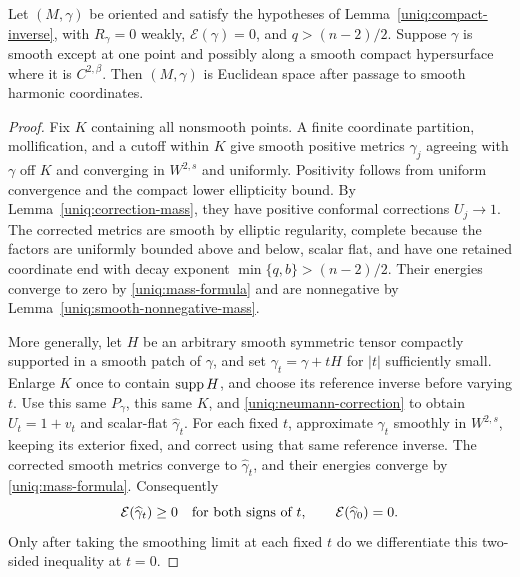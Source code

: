 \begin{lemma}
\label{uniq:rough-zero-mass}
Let $(M,\gamma)$ be oriented and satisfy the hypotheses of
Lemma~\ref{uniq:compact-inverse}, with $R_\gamma=0$ weakly,
$\mathcal E(\gamma)=0$, and $q>(n-2)/2$. Suppose $\gamma$ is
smooth except at one point and possibly along a smooth compact
hypersurface where it is $C^{2,\beta}$. Then $(M,\gamma)$ is
Euclidean space after passage to smooth harmonic coordinates.
\end{lemma}

\begin{proof}
Fix $K$ containing all nonsmooth points. A finite coordinate
partition, mollification, and a cutoff within $K$ give smooth
positive metrics $\gamma_j$ agreeing with $\gamma$ off $K$
and converging in $W^{2,s}$ and uniformly. Positivity follows
from uniform convergence and the compact lower ellipticity bound.
By Lemma~\ref{uniq:correction-mass}, they have positive conformal
corrections $U_j\to1$. The corrected metrics are smooth by elliptic
regularity, complete because the factors are uniformly bounded
above and below, scalar flat, and have one retained coordinate
end with decay exponent $\min\{q,b\}>(n-2)/2$. Their energies converge to
zero by \eqref{uniq:mass-formula} and are nonnegative by
Lemma~\ref{uniq:smooth-nonnegative-mass}.

More generally, let $H$ be an arbitrary smooth symmetric tensor
compactly supported in a smooth patch of $\gamma$, and set
$\gamma_t=\gamma+tH$ for $|t|$ sufficiently small. Enlarge $K$
once to contain $\operatorname{supp} H$, and choose its reference inverse before
varying $t$. Use this same $P_\gamma$, this same $K$, and
\eqref{uniq:neumann-correction} to obtain $U_t=1+v_t$ and
scalar-flat $\widehat\gamma_t$. For each fixed $t$, approximate
$\gamma_t$ smoothly in $W^{2,s}$, keeping its exterior fixed,
and correct using that same reference inverse. The corrected
smooth metrics converge to $\widehat\gamma_t$, and their
energies converge by \eqref{uniq:mass-formula}. Consequently
\[
 \mathcal E(\widehat\gamma_t)\geq0
 \quad\hbox{for both signs of }t,
 \qquad \mathcal E(\widehat\gamma_0)=0.
\]
Only after taking the smoothing limit at each fixed $t$ do we
differentiate this two-sided inequality at $t=0$.


\end{proof}
